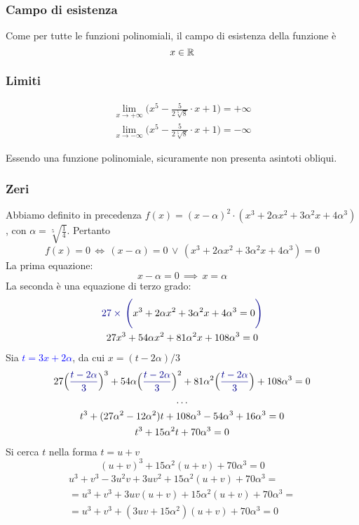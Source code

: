 \documentclass[a4paper, oneside, titlepage, reqno]{book}
\newcommand{\blue}[1]{\textcolor{blue}{#1}}
\begin{document}
\subsubsection*{Campo di esistenza}

Come per tutte le funzioni polinomiali, il campo di esistenza della funzione è 
\[
x\in\mathbb{R}
\]

\subsubsection*{Limiti}

\begin{gather*}
\lim_{x\to+\infty}\Big(x^5-\frac{5}{2\sqrt[5]{8}}\cdot x+1\Big)=+\infty\\
\lim_{x\to-\infty}\Big(x^5-\frac{5}{2\sqrt[5]{8}}\cdot x+1\Big)=-\infty
\end{gather*}

Essendo una funzione polinomiale, sicuramente non presenta asintoti obliqui.

\subsubsection*{Zeri}

Abbiamo definito in precedenza $f(x)=(x-\alpha)^2\cdot (x^3+2\alpha x^2+3\alpha^2x+4\alpha^3)$, con $\alpha=\sqrt[5]{\frac{1}{4}}$. Pertanto
\[
f(x)=0\,\iff\, (x-\alpha)=0\,\lor\,(x^3+2\alpha x^2+3\alpha^2x+4\alpha^3)=0
\]
La prima equazione:
\[x-\alpha=0\,\implies\, x=\alpha\]
La seconda è una equazione di terzo grado\supercite{eq:ter}:
\begin{gather*}
\textcolor{blue}{27\times\,\Bigg(}x^3+2\alpha x^2+3\alpha^2x+4\alpha^3=0\textcolor{blue}{\Bigg)}\\
27x^3+54\alpha x^2+81\alpha^2 x + 108 \alpha^3=0
\end{gather*}
Sia \blue{$t=3x+2\alpha$}, da cui $x=(t-2\alpha)/3$
\begin{gather*}
27\Big(\blue{\frac{t-2\alpha}{3}}\Big)^3+54\alpha \Big(\blue{\frac{t-2\alpha}{3}}\Big)^2+81\alpha^2 \Big(\blue{\frac{t-2\alpha}{3}}\Big) + 108 \alpha^3=0\\
\dots\\
t^3+(27\alpha^2-12\alpha^2)t+108\alpha^3-54\alpha^3+16\alpha^3=0\\
t^3+15\alpha^2t+70\alpha^3=0
\end{gather*}
Si cerca $t$ nella forma $t=u+v$
\[
(u+v)^3+15\alpha^2(u+v)+70\alpha^3=0
\]
\begin{multline*}
u^3+v^3-3u^2v+3uv^2+15\alpha^2(u+v)+70\alpha^3=\\
=u^3+v^3+3uv(u+v)+15\alpha^2(u+v)+70\alpha^3=\\
=u^3+v^3+(3uv+15\alpha^2)(u+v)+70\alpha^3=0
\end{multline*}
\end{document}
